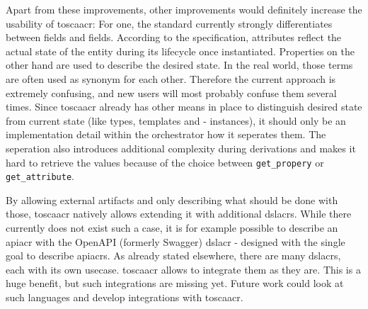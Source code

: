 Apart from these  improvements, other improvements would definitely increase the usability of \gls{toscaacr}: For one, the standard currently strongly differentiates between  fields and  fields. According to the specification, attributes reflect the actual state of the entity during its lifecycle once instantiated. Properties on the other hand are used to describe the desired state. In the real world, those terms are often used as synonym for each other. Therefore the current approach is extremely confusing, and new users will most probably confuse them several times. Since \gls{toscaacr} already has other means in place to distinguish desired state from current state (like types, templates and - instances), it should only be an implementation detail within the orchestrator how it seperates them. The seperation also introduces additional complexity during derivations and makes it hard to retrieve the values because of the choice between \texttt{get_propery} or \texttt{get_attribute}.

By allowing external artifacts and only describing what should be done with those, \gls{toscaacr} natively allows extending it with additional \gls{dslacr}s. While there currently does not exist such a case, it is for example possible to describe an \gls{apiacr} with the OpenAPI (formerly Swagger) \gls{dslacr} - designed with the single goal to describe \gls{apiacr}s. As already stated elsewhere, there are many \gls{dslacr}s, each with its own usecase. \Gls{toscaacr} allows to integrate them as they are. This is a huge benefit, but such integrations are missing yet. Future work could look at such languages and develop integrations with \gls{toscaacr}.

